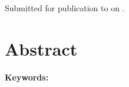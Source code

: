 \documentclass[onecolumn,11pt,A4]{article}
\begin{document}
\begin{FlushLeft}
    {\Large\bfseries \Title}
    \\[0.3cm]
    \Authors
    \\[0.3cm]
    {\Affiliations}
    \\[0.3cm]
    {Submitted for publication to \textit{\Journal{}} on \SubmittedOn.}
    \\[0.3cm]
\end{FlushLeft}

\linenumbers

\section*{Abstract}



\vspace{0.5cm}
\noindent
\textbf{Keywords:} \Keywords{}





\end{document}
